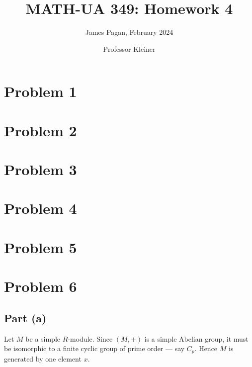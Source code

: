 \documentclass[11pt]{article}
\title{MATH-UA 349: Homework 4}
\author{James Pagan, February 2024}
\date{Professor Kleiner}
\begin{document}
\maketitle
\tableofcontents
\newpage


\section{Problem 1}


\section{Problem 2}


\section{Problem 3}


\section{Problem 4}


\section{Problem 5}


\section{Problem 6}


\subsection{Part (a)}

Let $M$ be a simple $R$-module. Since $(M, +)$ is a simple Abelian group, it must be isomorphic to a finite cyclic group of prime order --- say $C_{p}$. Hence $M$ is generated by one element $x$.
\end{document}
